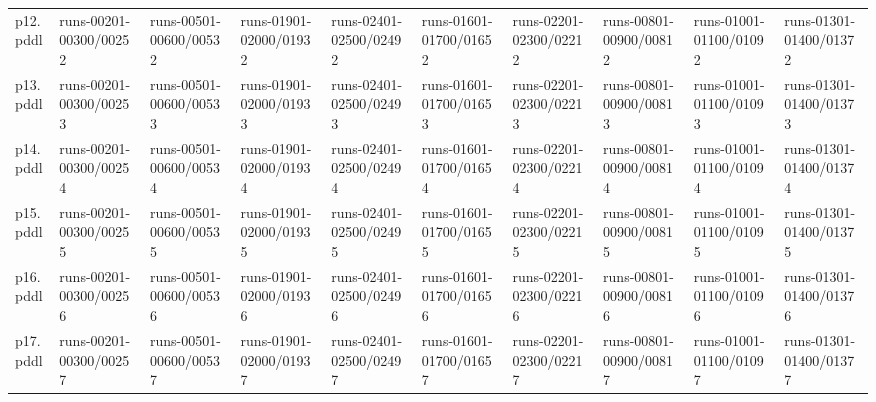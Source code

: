 \documentclass{article}
\begin{document}
\begin{tabular}{@{}lrrrrrrrrr@{}}
p12.pddl & \multicolumn{1}{|l|}{runs-00201-00300/00252} & \multicolumn{1}{|l|}{runs-00501-00600/00532} & \multicolumn{1}{|l|}{runs-01901-02000/01932} & \multicolumn{1}{|l|}{runs-02401-02500/02492} & \multicolumn{1}{|l|}{runs-01601-01700/01652} & \multicolumn{1}{|l|}{runs-02201-02300/02212} & \multicolumn{1}{|l|}{runs-00801-00900/00812} & \multicolumn{1}{|l|}{runs-01001-01100/01092} & \multicolumn{1}{|l|}{runs-01301-01400/01372} \\
p13.pddl & \multicolumn{1}{|l|}{runs-00201-00300/00253} & \multicolumn{1}{|l|}{runs-00501-00600/00533} & \multicolumn{1}{|l|}{runs-01901-02000/01933} & \multicolumn{1}{|l|}{runs-02401-02500/02493} & \multicolumn{1}{|l|}{runs-01601-01700/01653} & \multicolumn{1}{|l|}{runs-02201-02300/02213} & \multicolumn{1}{|l|}{runs-00801-00900/00813} & \multicolumn{1}{|l|}{runs-01001-01100/01093} & \multicolumn{1}{|l|}{runs-01301-01400/01373} \\
p14.pddl & \multicolumn{1}{|l|}{runs-00201-00300/00254} & \multicolumn{1}{|l|}{runs-00501-00600/00534} & \multicolumn{1}{|l|}{runs-01901-02000/01934} & \multicolumn{1}{|l|}{runs-02401-02500/02494} & \multicolumn{1}{|l|}{runs-01601-01700/01654} & \multicolumn{1}{|l|}{runs-02201-02300/02214} & \multicolumn{1}{|l|}{runs-00801-00900/00814} & \multicolumn{1}{|l|}{runs-01001-01100/01094} & \multicolumn{1}{|l|}{runs-01301-01400/01374} \\
p15.pddl & \multicolumn{1}{|l|}{runs-00201-00300/00255} & \multicolumn{1}{|l|}{runs-00501-00600/00535} & \multicolumn{1}{|l|}{runs-01901-02000/01935} & \multicolumn{1}{|l|}{runs-02401-02500/02495} & \multicolumn{1}{|l|}{runs-01601-01700/01655} & \multicolumn{1}{|l|}{runs-02201-02300/02215} & \multicolumn{1}{|l|}{runs-00801-00900/00815} & \multicolumn{1}{|l|}{runs-01001-01100/01095} & \multicolumn{1}{|l|}{runs-01301-01400/01375} \\
p16.pddl & \multicolumn{1}{|l|}{runs-00201-00300/00256} & \multicolumn{1}{|l|}{runs-00501-00600/00536} & \multicolumn{1}{|l|}{runs-01901-02000/01936} & \multicolumn{1}{|l|}{runs-02401-02500/02496} & \multicolumn{1}{|l|}{runs-01601-01700/01656} & \multicolumn{1}{|l|}{runs-02201-02300/02216} & \multicolumn{1}{|l|}{runs-00801-00900/00816} & \multicolumn{1}{|l|}{runs-01001-01100/01096} & \multicolumn{1}{|l|}{runs-01301-01400/01376} \\
p17.pddl & \multicolumn{1}{|l|}{runs-00201-00300/00257} & \multicolumn{1}{|l|}{runs-00501-00600/00537} & \multicolumn{1}{|l|}{runs-01901-02000/01937} & \multicolumn{1}{|l|}{runs-02401-02500/02497} & \multicolumn{1}{|l|}{runs-01601-01700/01657} & \multicolumn{1}{|l|}{runs-02201-02300/02217} & \multicolumn{1}{|l|}{runs-00801-00900/00817} & \multicolumn{1}{|l|}{runs-01001-01100/01097} & \multicolumn{1}{|l|}{runs-01301-01400/01377} \\

\end{tabular}
\end{document}
